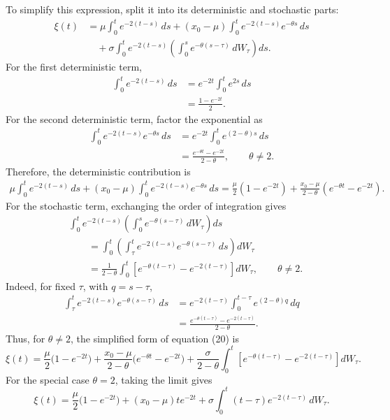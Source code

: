 \documentclass[11pt]{article}
\begin{document}
To simplify this expression, split it into its deterministic and stochastic
parts:
\begin{align*}
    \xi(t)
     & = \mu\int_0^t e^{-2(t-s)}\,ds
    +(x_0-\mu)\int_0^t e^{-2(t-s)}e^{-\theta s}\,ds \\
     & \quad +\sigma\int_0^t e^{-2(t-s)}
    \left(\int_0^s e^{-\theta(s-\tau)}\,dW_\tau\right)ds.
\end{align*}
For the first deterministic term,
\begin{align*}
    \int_0^t e^{-2(t-s)}\,ds
     & =e^{-2t}\int_0^t e^{2s}\,ds \\
     & =\frac{1-e^{-2t}}{2}.
\end{align*}
For the second deterministic term, factor the exponential as
\begin{align*}
    \int_0^t e^{-2(t-s)}e^{-\theta s}\,ds
     & =e^{-2t}\int_0^t e^{(2-\theta)s}\,ds     \\
     & =\frac{e^{-\theta t}-e^{-2t}}{2-\theta},
    \qquad \theta\ne2.
\end{align*}
Therefore, the deterministic contribution is
\begin{align*}
    \mu\int_0^t e^{-2(t-s)}\,ds
    +(x_0-\mu)\int_0^t e^{-2(t-s)}e^{-\theta s}\,ds
    =\frac{\mu}{2}(1-e^{-2t})
    +\frac{x_0-\mu}{2-\theta}
    (e^{-\theta t}-e^{-2t}).
\end{align*}
For the stochastic term, exchanging the order of integration gives
\begin{align*}
     & \int_0^t e^{-2(t-s)}
    \left(\int_0^s e^{-\theta(s-\tau)}\,dW_\tau\right)ds               \\
     & \qquad = \int_0^t
    \left(\int_\tau^t e^{-2(t-s)}e^{-\theta(s-\tau)}\,ds\right)dW_\tau \\
     & \qquad = \frac{1}{2-\theta}\int_0^t
    \left[e^{-\theta(t-\tau)}-e^{-2(t-\tau)}\right]dW_\tau,
    \qquad \theta\ne 2.
\end{align*}
Indeed, for fixed $\tau$, with $q=s-\tau$,
\begin{align*}
    \int_\tau^t e^{-2(t-s)}e^{-\theta(s-\tau)}\,ds
     & =e^{-2(t-\tau)}\int_0^{t-\tau}e^{(2-\theta)q}\,dq     \\
     & =\frac{e^{-\theta(t-\tau)}-e^{-2(t-\tau)}}{2-\theta}.
\end{align*}
Thus, for $\theta\ne 2$, the simplified form of equation (20) is
\begin{equation}
    \xi(t)=\frac{\mu}{2}\bigl(1-e^{-2t}\bigr)
    +\frac{x_0-\mu}{2-\theta}\bigl(e^{-\theta t}-e^{-2t}\bigr)
    +\frac{\sigma}{2-\theta}\int_0^t
    \left[e^{-\theta(t-\tau)}-e^{-2(t-\tau)}\right]dW_\tau.
\end{equation}
For the special case $\theta=2$, taking the limit gives
\begin{equation}
    \xi(t)=\frac{\mu}{2}\bigl(1-e^{-2t}\bigr)
    +(x_0-\mu)t e^{-2t}
    +\sigma\int_0^t (t-\tau)e^{-2(t-\tau)}\,dW_\tau.
\end{equation}
\end{document}

